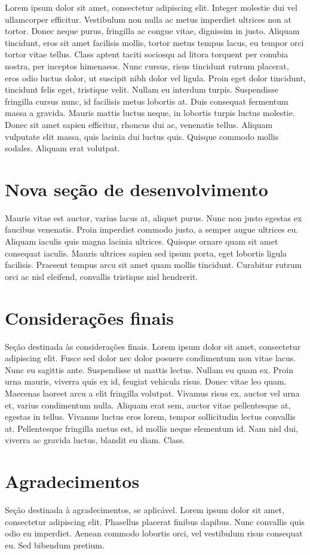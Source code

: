 \documentclass[a4paper]{article}
\begin{document}
Lorem ipsum \cite{exemplodereferencia} dolor sit amet, consectetur adipiscing elit. Integer molestie dui vel ullamcorper efficitur. Vestibulum non nulla ac metus imperdiet ultrices non at tortor. Donec neque purus, fringilla ac congue vitae, dignissim in justo. Aliquam tincidunt, eros sit amet facilisis mollis, tortor metus tempus lacus, eu tempor orci tortor vitae tellus. Class aptent taciti sociosqu ad litora torquent per conubia nostra, per inceptos himenaeos. Nunc cursus, risus tincidunt rutrum placerat, eros odio luctus dolor, ut suscipit nibh dolor vel ligula. Proin eget dolor tincidunt, tincidunt felis eget, tristique velit. Nullam eu interdum turpis. Suspendisse fringilla cursus nunc, id facilisis metus lobortis at. Duis consequat fermentum massa a gravida. Mauris mattis luctus neque, in lobortis turpis luctus molestie. Donec sit amet sapien efficitur, rhoncus dui ac, venenatis tellus. Aliquam vulputate elit massa, quis lacinia dui luctus quis. Quisque commodo mollis sodales. Aliquam erat volutpat.

\section{Nova seção de desenvolvimento}

Mauris vitae est auctor, varius lacus at, aliquet purus. Nunc non justo egestas ex faucibus venenatis. Proin imperdiet commodo justo, a semper augue ultrices eu. Aliquam iaculis quis magna lacinia ultrices. Quisque ornare quam sit amet consequat iaculis. Mauris ultrices sapien sed ipsum porta, eget lobortis ligula facilisis. Praesent tempus arcu sit amet quam mollis tincidunt. Curabitur rutrum orci ac nisl eleifend, convallis tristique nisl hendrerit.

\section{Considerações finais}

Seção destinada às considerações finais. Lorem ipsum dolor sit amet, consectetur adipiscing elit. Fusce sed dolor nec dolor posuere condimentum non vitae lacus. Nunc eu sagittis ante. Suspendisse ut mattis lectus. Nullam eu quam ex. Proin urna mauris, viverra quis ex id, feugiat vehicula risus. Donec vitae leo quam. Maecenas laoreet arcu a elit fringilla volutpat. Vivamus risus ex, auctor vel urna et, varius condimentum nulla. Aliquam erat sem, auctor vitae pellentesque at, egestas in tellus. Vivamus luctus eros lorem, tempor sollicitudin lectus convallis at. Pellentesque fringilla metus est, id mollis neque elementum id. Nam nisl dui, viverra ac gravida luctus, blandit eu diam. Class.

\section*{Agradecimentos}

Seção destinada à agradecimentos, se aplicável. Lorem ipsum dolor sit amet, consectetur adipiscing elit. Phasellus placerat finibus dapibus. Nunc convallis quis odio eu imperdiet. Aenean commodo lobortis orci, vel vestibulum risus consequat eu. Sed bibendum pretium.

\printbibliography
\end{document}
